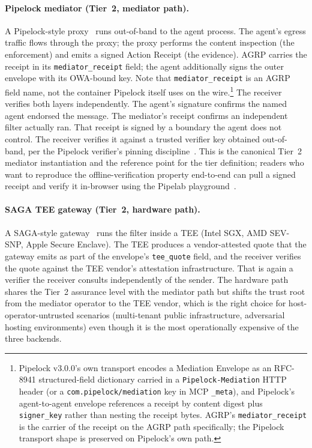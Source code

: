 \paragraph{Pipelock mediator (Tier~2, mediator path).}
A Pipelock-style proxy~\cite{pipelock} runs out-of-band
to the agent process. The agent's egress traffic flows
through the proxy; the proxy performs the content
inspection (the enforcement) and emits a signed Action
Receipt (the evidence). AGRP carries the receipt in its
\texttt{mediator\_receipt} field; the agent additionally
signs the outer envelope with its OWA-bound key. Note
that \texttt{mediator\_receipt} is an AGRP field name,
not the container Pipelock itself uses on the
wire.\footnote{Pipelock v3.0.0's own transport encodes
a Mediation Envelope as an RFC-8941 structured-field
dictionary carried in a \texttt{Pipelock-Mediation}
HTTP header (or a \texttt{com.pipelock/mediation} key
in MCP \texttt{\_meta}), and Pipelock's agent-to-agent
envelope references a receipt by content digest plus
\texttt{signer\_key} rather than nesting the receipt
bytes. AGRP's \texttt{mediator\_receipt} is the carrier
of the receipt on the AGRP path specifically; the
Pipelock transport shape is preserved on Pipelock's own
path.} The receiver verifies both layers independently.
The agent's signature confirms the named agent endorsed
the message. The mediator's receipt confirms an
independent filter actually ran. That receipt is signed
by a boundary the agent does not control. The receiver
verifies it against a trusted verifier key obtained
out-of-band, per the Pipelock verifier's pinning
discipline~\cite{pipelab_independent_attestation}. This is
the canonical Tier~2 mediator instantiation and the
reference point for the tier definition; readers who
want to reproduce the offline-verification property
end-to-end can pull a signed receipt and verify it
in-browser using the Pipelab
playground~\cite{pipelab_playground}.

\paragraph{SAGA TEE gateway (Tier~2, hardware path).}
A SAGA-style gateway~\cite{saga2026} runs the filter
inside a TEE (Intel SGX, AMD SEV-SNP, Apple Secure
Enclave). The TEE produces a vendor-attested quote that
the gateway emits as part of the envelope's
\texttt{tee\_quote} field, and the receiver verifies
the quote against the TEE vendor's attestation
infrastructure. That is again a verifier the receiver
consults independently of the sender. The hardware
path shares the Tier~2 assurance level with the
mediator path but shifts the trust root from the
mediator operator to the TEE vendor, which is the
right choice for host-operator-untrusted scenarios
(multi-tenant public infrastructure, adversarial hosting
environments) even though it is the most operationally
expensive of the three backends.


